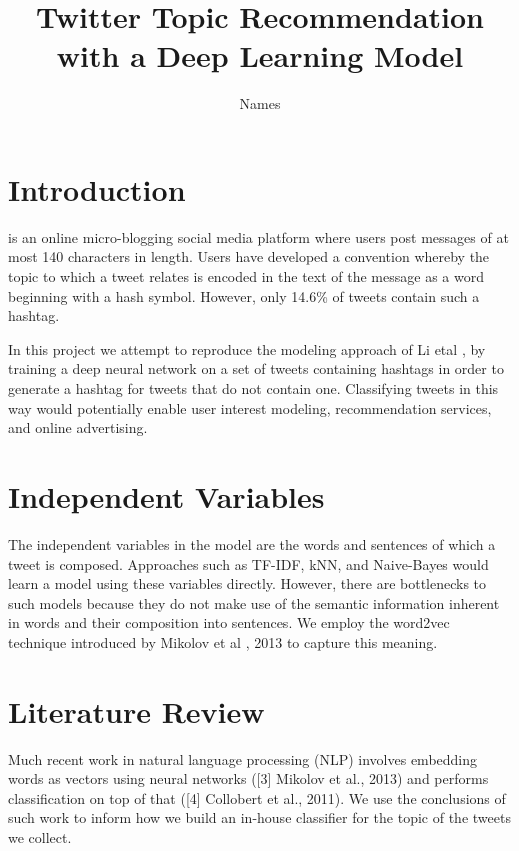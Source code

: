 \documentclass[journal, a4paper]{IEEEtran}
\begin{document}
	\title{Twitter Topic Recommendation with a Deep Learning Model}
	\author{Names}
	\maketitle

\section{Introduction}
	 is an online micro-blogging social media platform where users post messages of at most 140 characters in length. Users have developed a convention whereby the topic to which a tweet relates is encoded in the text of the message as a word beginning with a hash symbol. However, only 14.6\% of tweets contain such a hashtag.

	
	In this project we attempt to reproduce the modeling approach of Li etal \cite{Li-lstm}, by training a deep neural network on a set of tweets containing hashtags in order to generate a hashtag for tweets that do not contain one. Classifying tweets in this way would potentially enable user interest modeling, recommendation services, and online advertising.

\section{Independent Variables}
The independent variables in the model are the words and sentences of which a tweet is composed. Approaches such as TF-IDF, kNN, and Naive-Bayes would learn a model using these variables directly. However, there are bottlenecks to such models because they do not make use of the semantic information inherent in words and their composition into sentences. We employ the word2vec technique introduced by Mikolov et al \cite{word2vec}, 2013 to capture this meaning.
\section{Literature Review}
	Much recent work in natural language processing (NLP) involves embedding words as vectors using neural networks ([3] Mikolov et al., 2013) and performs classification on top of that ([4] Collobert et al., 2011). We use the conclusions of such work to inform how we build an in-house classifier for the topic of the tweets we collect.
\end{document}
